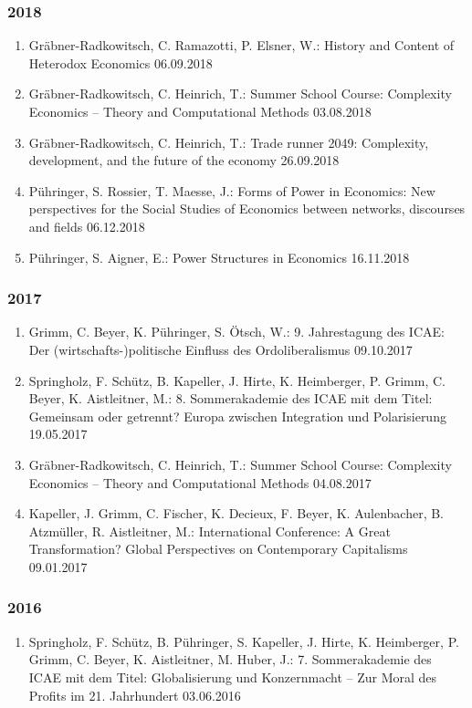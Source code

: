 \subsubsection*{2018}
\begin{enumerate}
	\item Gräbner-Radkowitsch, C. Ramazotti, P. Elsner, W.: History and Content of Heterodox Economics 06.09.2018
	\item Gräbner-Radkowitsch, C. Heinrich, T.: Summer School Course: Complexity Economics -- Theory and Computational Methods 03.08.2018
	\item Gräbner-Radkowitsch, C. Heinrich, T.: Trade runner 2049: Complexity, development, and the future of the economy 26.09.2018
	\item Pühringer, S. Rossier, T.  Maesse, J.: Forms of Power in Economics: New perspectives for the Social Studies of Economics between networks, discourses and fields 06.12.2018
	\item Pühringer, S. Aigner, E.: Power Structures in Economics 16.11.2018
\end{enumerate}
\subsubsection*{2017}
\begin{enumerate}
	\item Grimm, C. Beyer, K. Pühringer, S. Ötsch, W.: 9. Jahrestagung des ICAE: Der (wirtschafts-)politische Einfluss des Ordoliberalismus 09.10.2017
	\item Springholz, F. Schütz, B. Kapeller, J. Hirte, K. Heimberger, P. Grimm, C. Beyer, K. Aistleitner, M.: 8. Sommerakademie des ICAE mit dem Titel: Gemeinsam oder getrennt? Europa zwischen Integration und Polarisierung 19.05.2017
	\item Gräbner-Radkowitsch, C. Heinrich, T.: Summer School Course: Complexity Economics -- Theory and Computational Methods 04.08.2017
	\item Kapeller, J. Grimm, C. Fischer, K. Decieux, F. Beyer, K. Aulenbacher, B. Atzmüller, R. Aistleitner, M.: International Conference: A Great Transformation? Global Perspectives on Contemporary Capitalisms 09.01.2017
\end{enumerate}
\subsubsection*{2016}
\begin{enumerate}
	\item Springholz, F. Schütz, B. Pühringer, S. Kapeller, J.  Hirte, K. Heimberger, P. Grimm, C. Beyer, K. Aistleitner, M. Huber, J.: 7. Sommerakademie des ICAE mit dem Titel: Globalisierung und Konzernmacht – Zur Moral des Profits im 21. Jahrhundert 03.06.2016
\end{enumerate}
